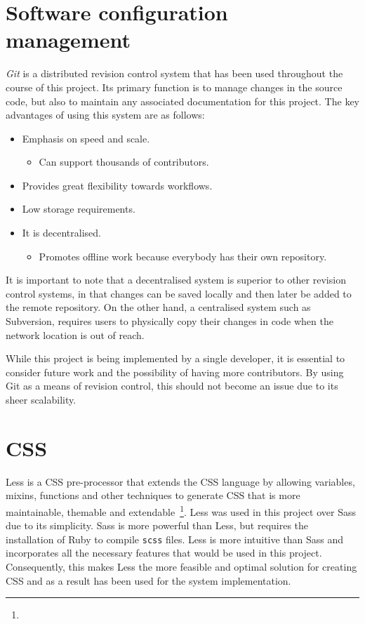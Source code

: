 \section{Software configuration management} {
\label{sec:software_configuration_management}

	\emph{Git} is a distributed revision control system that has been used throughout the course of this project. Its primary function is to manage changes in the source code, but also to maintain any associated documentation for this project. The key advantages of using this system are as follows:

	\begin{itemize}
		\item Emphasis on speed and scale.
			\begin{itemize}
				\item Can support thousands of contributors.
			\end{itemize}
		\item Provides great flexibility towards workflows.
		\item Low storage requirements.
		\item It is decentralised.
			\begin{itemize}
				\item Promotes offline work because everybody has their own repository.
			\end{itemize}
	\end{itemize}

	It is important to note that a decentralised system is superior to other revision control systems, in that changes can be saved locally and then later be added to the remote repository. On the other hand, a centralised system such as Subversion, requires users to physically copy their changes in code when the network location is out of reach.

	While this project is being implemented by a single developer, it is essential to consider future work and the possibility of having more contributors. By using Git as a means of revision control, this should not become an issue due to its sheer scalability.

}

\section{CSS} {
\label{sec:css}

	Less is a CSS pre-processor that extends the CSS language by allowing variables, mixins, functions and other techniques to generate CSS that is more maintainable, themable and extendable~\footnote{}. Less was used in this project over Sass due to its simplicity. Sass is more powerful than Less, but requires the installation of Ruby to compile \texttt{scss} files. Less is more intuitive than Sass and incorporates all the necessary features that would be used in this project. Consequently, this makes Less the more feasible and optimal solution for creating CSS and as a result has been used for the system implementation.

}


